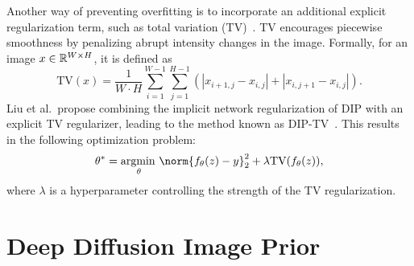 Another way of preventing overfitting is to incorporate an additional explicit regularization term, such as total variation (TV)~\cite{TV}.
TV encourages piecewise smoothness by penalizing abrupt intensity changes in the image.
Formally, for an image $x \in \mathbb{R}^{W \times H}$, it is defined as
\begin{equation}
    \text{TV}(x) = \frac{1}{W \cdot H} \sum_{i=1}^{W-1} \sum_{j=1}^{H-1} (|x_{i+1,j} - x_{i,j}| + |x_{i,j+1} - x_{i,j}|).
\end{equation}
Liu et al.\ propose combining the implicit network regularization of DIP with an explicit TV regularizer, leading to the method known as DIP-TV~\cite{DIP-TV}.
This results in the following optimization problem:
\begin{equation}
    \theta^* = \argmin_\theta \norm{f_\theta(z) - y}_2^2 + \lambda \text{TV}(f_\theta(z)),
\end{equation}
where $\lambda$ is a hyperparameter controlling the strength of the TV regularization.

\section{Deep Diffusion Image Prior}


